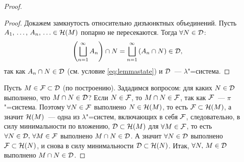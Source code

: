 \begin{theorem}[Дынкин]
\begin{proof}
\begin{lemma}
\begin{proof}
                Докажем замкнутость относительно дизъюнктных объединений. Пусть 
                $A_1,\,\ldots,\,A_n,\,\ldots\in\mathcal{H}(M)$ попарно не пересекаются. Тогда $\forall N\in\mathcal{D}$:
                \[
                    \left(\bigsqcup_{n=1}^{\infty}A_n\right)\cap N=\bigsqcup_{n=1}^{\infty}\left(A_n\cap N\right)\in \mathcal{D},
                \]
                так как $A_n\cap N\in\mathcal{D}$ (см. условие \eqref{eq:lemmastate}) и $\mathcal{D}$~--- $\lambda$"=система.

            \end{proof}
        \end{lemma}

        Пусть $M\in\mathcal{F} \subset\mathcal{D}$ (по построению). Зададимся вопросом: для каких $N\in\mathcal{D}$ выполнено, что $M\cap N\in\mathcal{D}$?
        Если $N\in\mathcal{F} $, то $M\cap N\in\mathcal{F} $, так как $\mathcal{F} $~--- $\pi$"=система. Поэтому $\forall N\in\mathcal{F} $
        выполнено $N\in\mathcal{H}(M)$, то есть $\mathcal{F} \subset\mathcal{H}(M)$, а значит $\mathcal{H}(M)$~--- одна из $\lambda$"=систем, включающих в себя 
        $\mathcal{F} $, следовательно, в силу минимальности по вложению, $\mathcal{D}\subset\mathcal{H}(M)$ для $\forall M\in\mathcal{F} $, 
        то есть $\forall N\in\mathcal{D},\, \forall M\in\mathcal{F} $ выполнено $M\cap N\in\mathcal{D}$. А значит $\forall N\in\mathcal{D}$ выполнено $\mathcal{F} \subset\mathcal{H}(N)$, и 
        снова в силу минимальности $\mathcal{D}\subset \mathcal{H}(N)$. Итак, $\forall N,\, M\in\mathcal{D}$ выполнено $M\cap N\in\mathcal{D}$.
        
    \end{proof}
\end{theorem}

